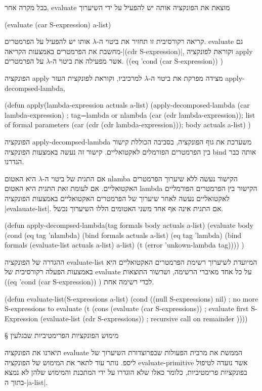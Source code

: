 \documentclass[a4paper,12pt,reqno]{article}
\begin{document}
בכל מקרה אחר, evaluate מוצאת את הפונקציה אותה יש להפעיל על ידי השיערוך
\begin{LISP}
(evaluate (car S-expression) a-list)
\end{LISP}
קריאה רקורסיבית זו תחזיר את ביטוי ה-$λ$ אותו יש להפעיל על הפרמטרים. evaluate
גם מחשבת את הפרמטרים באמצעות הקריאה-\T|(cdr S-expression)|, וקוראת לפונקציה
apply אשר מפעילה את ביטוי ה-$λ$ על הפרמטרים.
    ((eq 'cond (car S-expression)) )

הפונקציה apply מצידה מפרקת את ביטוי ה-$λ$ למרכיביו, וקוראת לפונקצית העזר
apply-decompsed-lambda,
\begin{LISP}
(defun apply(lambda-expression actuals a-list)
  (apply-decomposed-lambda
    (car lambda-expression) ; tag=lambda or nlambda
    (car (cdr lambda-expression)); list of formal parameters
    (car (cdr (cdr lambda-expression))); body
    actuals
    a-list)
)
\end{LISP}
הפונקציה apply-decompsed-lambda משערכת את גוף הפונקציה, בסביבה הכוללת קישור בין
הפרמטרים הפורמלים לאקטואליים. קישור זה נעשה באמצעות הפונקציה bind אותה כבר
הגדרנו. 


אם התגית של ביטוי ה-$λ$ היא האטום nlamba הקישור נעשה ללא שיערוך
הפרמטרים האקטואליים. אם לעומת זאת התגית היא האטום lambda הקישור בין הפרמטרים
הפורמליים לאקטואליים נעשה לאחר שיערוך של הפרמטרים האקטואליים באמצעות הפונקציה
\E|evalauate-list|. אם התגית אינה אף אחד משני האטומים הללו השיערוך נכשל.
\begin{LISP}
(defun apply-decompsed-lambda(tag formals body actuals a-list)
  (evaluate body
    (cond
      (eq tag 'nlambda) (bind formals actuals a-list)
      (eq tag 'lambda) (bind formals (evaluate-list actuals a-list) a-list)
      (t (error 'unkown-lambda tag))))
)
\end{LISP}
ההגדרה של הפונקציה evaluate-list המיועדת לשיערוך רשימת הפרמטרים האקטואליים היא
באמצעות הפעלה רקורסיבית של evaluate על כל אחד מאיברי הרשימה, ושרשור התוצאות
    ((eq 'cond (car S-expression)) )
לכדי רשימה אחת.
\begin{LISP}
(defun
  evaluate-list(S-expressions a-list)
    (cond
      ((null S-expressions) nil) ; no more S-expressions to evaluate
      (t
        (cons
          (evaluate (car S-expressions)) ; evaluate first S-Expression
          (evaluate-list (cdr S-expressions)) ; recursive call on remainder
))))
\end{LISP}


§ מימוש הפונקציות הפרימטיביות שבגלעין

תיארנו את הפונקציה evaluate הממשת את מרבית הפעולות שבפרוצדורת השיערוך של ליספ. 
נותר עוד לתאר את המימוש של הפונקציה evaluate-primitive אשר נועדה לטיפול בפונקציות
פרימטיביות, כלומר כאלו שלא הוגדרו על ידי המתכנת והמימוש שלהן לא נמצא בתוך
ה-\E|a-list|.
\end{document}
